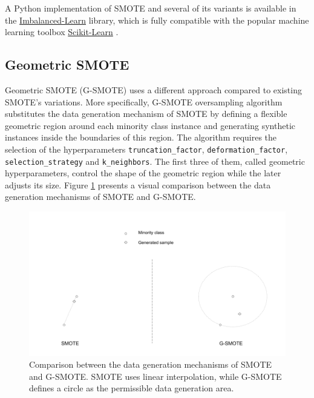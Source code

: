 \documentclass[preprint,12pt, a4paper]{elsarticle}
\begin{document}
A Python implementation of SMOTE and several of its variants is available in the \href{https://imbalanced-learn.org/stable/}{Imbalanced-Learn} \cite{Lemaitre2016} library, which is fully compatible with the popular machine learning toolbox \href{https://scikit-learn.org/stable/}{Scikit-Learn} \cite{Pedregosa2011}. 

\subsection{Geometric SMOTE}
\label{gsmote}

Geometric SMOTE (G-SMOTE) \cite{Douzas2019} uses a different approach compared to existing SMOTE's variations. More specifically, G-SMOTE oversampling algorithm substitutes the data generation mechanism of SMOTE by defining a flexible geometric region around each minority class instance and generating synthetic instances inside the boundaries of this region. The algorithm requires the selection of the hyperparameters \texttt{truncation\_factor}, \texttt{deformation\_factor}, \texttt{selection\_strategy} and \texttt{k\_neighbors}. The first three of them, called geometric hyperparameters, control the shape of the geometric region while the later adjusts its size. Figure \ref{fig:smote_vs_gsmote} presents a visual comparison between the data generation mechanisms of SMOTE and G-SMOTE.

\begin{figure}[H]
	\centering
	\includegraphics[width=1\linewidth]{../analysis/smote_vs_gsmote}
	\caption{Comparison between the data generation mechanisms of SMOTE and G-SMOTE. SMOTE uses linear interpolation, while G-SMOTE defines a circle as the permissible data generation area.}
	\label{fig:smote_vs_gsmote}
\end{figure}
\end{document}
